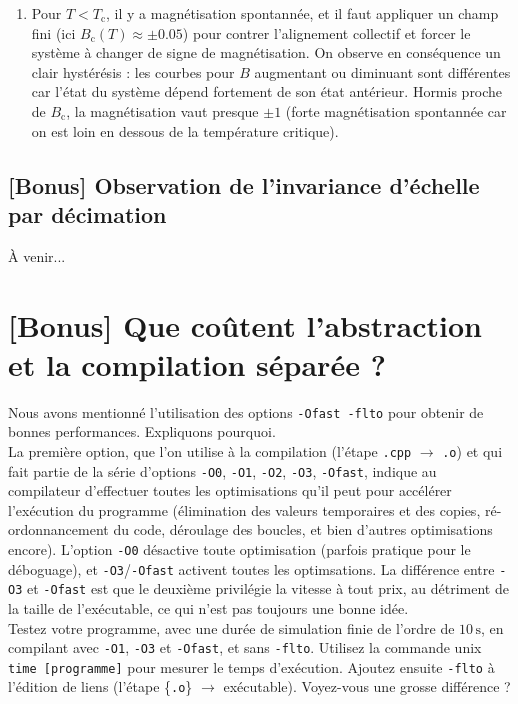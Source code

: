 \documentclass{book}
\newcommand{\inline}[1]{\texttt{#1}}
\begin{document}
\begin{correction}
\begin{enumerate}
\item Pour $T<T_\text{c}$, il y a magnétisation spontannée, et il faut appliquer un champ fini (ici $B_\text{c}(T) \approx \pm 0.05$) pour contrer l'alignement collectif et forcer le système à changer de signe de magnétisation. On observe en conséquence un clair hystérésis : les courbes pour $B$ augmentant ou diminuant sont différentes car l'état du système dépend fortement de son état antérieur. Hormis proche de $B_\text{c}$, la magnétisation vaut presque $\pm 1$ (forte magnétisation spontannée car on est loin en dessous de la température critique).
\end{enumerate}
\end{correction}

\subsection{[Bonus] Observation de l'invariance d'échelle par décimation}

À venir...

\section{[Bonus] Que coûtent l'abstraction et la compilation séparée ?}

Nous avons mentionné l'utilisation des options \inline{-Ofast -flto} pour obtenir de bonnes performances. Expliquons pourquoi.\\

La première option, que l'on utilise à la compilation (l'étape \texttt{.cpp} $\to$ \texttt{.o}) et qui fait partie de la série d'options \inline{-O0}, \inline{-O1}, \inline{-O2}, \inline{-O3}, \inline{-Ofast}, indique au compilateur d'effectuer toutes les optimisations qu'il peut pour accélérer l'exécution du programme (élimination des valeurs temporaires et des copies, ré-ordonnancement du code, déroulage des boucles, et bien d'autres optimisations encore). L'option \inline{-O0} désactive toute optimisation (parfois pratique pour le déboguage), et \inline{-O3}/\inline{-Ofast} activent toutes les optimsations. La différence entre \inline{-O3} et \inline{-Ofast} est que le deuxième privilégie la vitesse à tout prix, au détriment de la taille de l'exécutable, ce qui n'est pas toujours une bonne idée.\\

Testez votre programme, avec une durée de simulation finie de l'ordre de $10\,\mathrm{s}$, en compilant avec \inline{-O1}, \inline{-O3} et \inline{-Ofast}, et sans \inline{-flto}. Utilisez la commande unix \texttt{time [programme]} pour mesurer le temps d'exécution. Ajoutez ensuite \inline{-flto} à l'édition de liens (l'étape \{\texttt{.o}\} $\to$ exécutable). Voyez-vous une grosse différence ?\\
\end{document}
